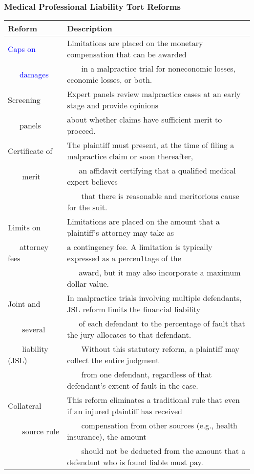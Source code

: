 \documentclass[serif,10pt]{beamer}
\begin{document}
\begin{frame}%
\frametitle{Medical Professional Liability Tort Reforms}


\begin{tabular}{l|l} \hline \hline
\textbf{Reform} &\textbf{Description }\\ \hline
\textcolor{blue}{Caps on} & Limitations are placed on the monetary compensation that can be awarded  \\
~~~\textcolor{blue}{damages} & ~~~ in a malpractice trial for noneconomic losses, economic losses, or both.  \\ \hline
Screening  & Expert panels review malpractice cases at an early stage and provide opinions \\
~~~panels &  about whether claims have sufficient merit to proceed. \\ \hline
Certificate of & The plaintiff must present, at the time of filing a malpractice claim or soon thereafter,  \\
~~~ merit & ~~~an affidavit certifying that a qualified medical expert believes \\
  &~~~ that there is reasonable and meritorious cause for the suit. \\ \hline
Limits on & Limitations are placed on the amount that a plaintiff's attorney may take as \\
~~~attorney fees&  a contingency fee. A limitation is typically expressed as a percen1tage of the \\
&~~~award, but it may also incorporate a maximum dollar value. \\\hline
Joint and & In malpractice trials involving multiple defendants, JSL reform limits the financial liability  \\
~~~  several& ~~~of each defendant to the percentage of fault that the jury allocates to that defendant. \\
~~~ liability (JSL)  &  ~~~ Without this statutory reform, a plaintiff may collect the entire judgment \\
&~~~ from one defendant, regardless of that defendant's extent of fault in the case. \\ \hline
Collateral & This reform eliminates a traditional rule that even if an injured plaintiff has received \\
~~~ source rule & ~~~ compensation from other sources (e.g., health insurance),  the amount \\
&~~~ should not be deducted from the amount that a defendant who is found liable must pay. \\ \hline

\end{tabular}
\end{frame}
\end{document}
